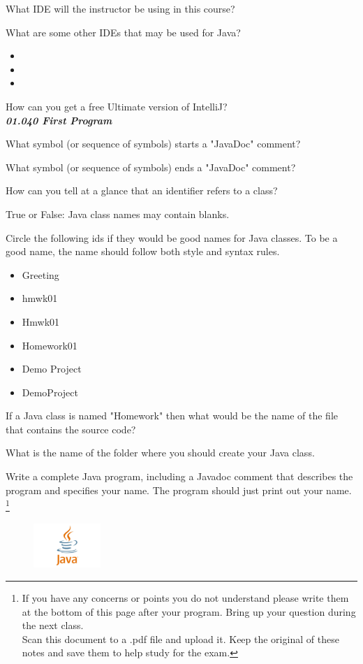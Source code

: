 \documentclass[letterpaper,11pt]{exam}
\begin{document}
\begin{questions}
\question What IDE will the instructor be using in this course?

\begin{samepage}
    \question What are some other IDEs that may be used for Java?
    \begin{itemize}
        \item 
        \item 
        \item 
    \end{itemize}
\end{samepage}

\question How can you get a free Ultimate version of IntelliJ?\\

\textit{\textbf{01.040 First Program}}

\question What symbol (or sequence of symbols) starts a "JavaDoc" comment?

\question What symbol (or sequence of symbols) ends a "JavaDoc" comment?

\question How can you tell at a glance that an identifier refers to a class?

\question True or False:  Java class names may contain blanks.

\begin{samepage}
    \question Circle the following ids if they would be good names for Java classes.  To be a good name, the name should follow both style and syntax rules.
    \begin{itemize}
        \item Greeting
        \item hmwk01
        \item Hmwk01
        \item Homework01
        \item Demo Project
        \item DemoProject
    \end{itemize}
\end{samepage}

\question If a Java class is named "Homework" then what would be the name of the file that contains the source code? \makebox[4cm]{\hrulefill}

\question What is the name of the folder where you should create your Java class.

\newpage
\question Write a complete Java program, including a Javadoc comment that describes the program and specifies your name.  The program should just print out your name.
\footnote{  If you have any concerns or points you do not understand please write them at the bottom of this page after your program. Bring up your question during the next class. \\Scan this document to a .pdf file and upload it.  Keep the original of these notes and save them to help study for the exam.}



\end{questions}
\begin{figure}[b]\label{end}
	\center
	\includegraphics[width=1in]{java}
	
\end{figure}
\end{document}

